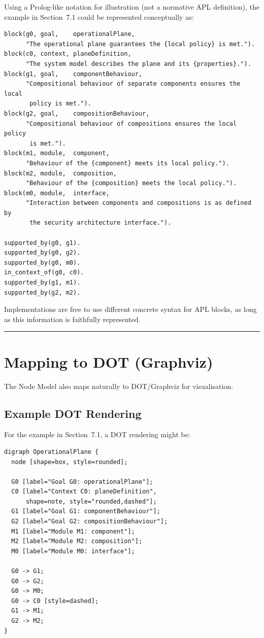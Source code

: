 \documentclass[11pt]{article}
\begin{document}
Using a Prolog-like notation for illustration (not a normative APL definition), the example in Section~7.1 could be represented conceptually as:

\begin{verbatim}
block(g0, goal,    operationalPlane,
      "The operational plane guarantees the {local policy} is met.").
block(c0, context, planeDefinition,
      "The system model describes the plane and its {properties}.").
block(g1, goal,    componentBehaviour,
      "Compositional behaviour of separate components ensures the local
       policy is met.").
block(g2, goal,    compositionBehaviour,
      "Compositional behaviour of compositions ensures the local policy
       is met.").
block(m1, module,  component,
      "Behaviour of the {component} meets its local policy.").
block(m2, module,  composition,
      "Behaviour of the {composition} meets the local policy.").
block(m0, module,  interface,
      "Interaction between components and compositions is as defined by
       the security architecture interface.").

supported_by(g0, g1).
supported_by(g0, g2).
supported_by(g0, m0).
in_context_of(g0, c0).
supported_by(g1, m1).
supported_by(g2, m2).
\end{verbatim}

Implementations are free to use different concrete syntax for APL blocks, as long as this information is faithfully represented.

\bigskip
\hrule
\bigskip

\section{Mapping to DOT (Graphviz)}

The Node Model also maps naturally to DOT/Graphviz for visualisation.

\subsection{Example DOT Rendering}

For the example in Section~7.1, a DOT rendering might be:

\begin{verbatim}
digraph OperationalPlane {
  node [shape=box, style=rounded];

  G0 [label="Goal G0: operationalPlane"];
  C0 [label="Context C0: planeDefinition",
      shape=note, style="rounded,dashed"];
  G1 [label="Goal G1: componentBehaviour"];
  G2 [label="Goal G2: compositionBehaviour"];
  M1 [label="Module M1: component"];
  M2 [label="Module M2: composition"];
  M0 [label="Module M0: interface"];

  G0 -> G1;
  G0 -> G2;
  G0 -> M0;
  G0 -> C0 [style=dashed];
  G1 -> M1;
  G2 -> M2;
}
\end{verbatim}
\end{document}
